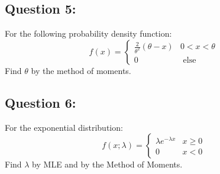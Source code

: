 \documentclass[
]{article}
\begin{document}
\hypertarget{question-5}{%
\subsection{Question 5:}\label{question-5}}

For the following probability density function:
\[f(x)=\left\{\begin{array}{ll}{\frac{2}{\theta^{2}}(\theta-x)} & {0<x<\theta} \\ {0} & {\text { else }}\end{array}\right.\]
Find \(\theta\) by the method of moments.

\hypertarget{question-6}{%
\subsection{Question 6:}\label{question-6}}

For the exponential distribution:
\[f(x ; \lambda)=\left\{\begin{array}{ll}{\lambda e^{-\lambda x}} & {x \geq 0} \\ {0} & {x<0}\end{array}\right.\]
Find \(\lambda\) by MLE and by the Method of Moments.
\end{document}
